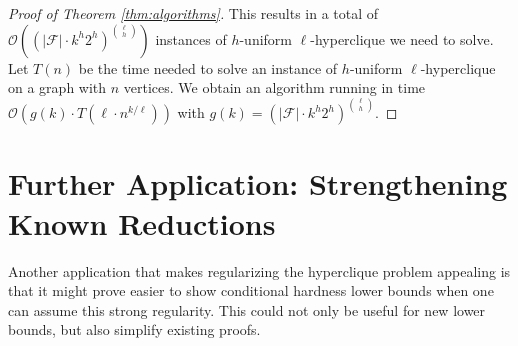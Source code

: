 \documentclass[a4paper,UKenglish,cleveref, autoref, thm-restate,numberwithinsect]{lipics-v2021}
\newcommand{\Fam}{\mathcal{F}}
\begin{document}
\begin{proof}[Proof of Theorem \ref{thm:algorithms}]
This results in a total of $\mathcal{O}\left((|\Fam| \cdot k^h 2^h)^{\ell \choose h}\right)$ instances of $h$-uniform $\ell$-hyperclique we need to solve.
Let $T(n)$ be the time needed to solve an instance of $h$-uniform $\ell$-hyperclique on a graph with $n$ vertices.
We obtain an algorithm running in time $\mathcal{O}\left(g(k)\cdot T\left(\ell\cdot n^{k/\ell}\right)\right)$ with $g(k) = (|\Fam|\cdot k^h 2^h)^{\ell \choose h}$. 
\end{proof}











\section{Further Application: Strengthening Known Reductions}
Another application that makes regularizing the hyperclique problem appealing is that
it might prove easier to show conditional hardness lower bounds when one can assume this strong regularity. 
This could not only be useful for new lower bounds, but also simplify existing proofs.
\end{document}
